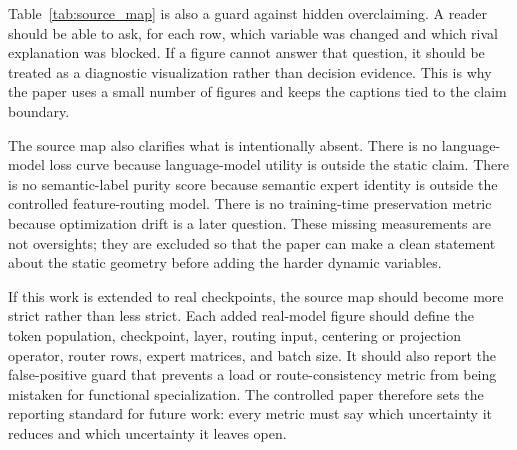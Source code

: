 \begin{table}[t]
\centering
\caption{Source map for the main evidence objects.}
\label{tab:source_map}
\small
\setlength{\tabcolsep}{3pt}
\end{table}

Table~\ref{tab:source_map} is also a guard against hidden overclaiming. A reader
should be able to ask, for each row, which variable was changed and which rival
explanation was blocked. If a figure cannot answer that question, it should be
treated as a diagnostic visualization rather than decision evidence. This is
why the paper uses a small number of figures and keeps the captions tied to the
claim boundary.

The source map also clarifies what is intentionally absent. There is no
language-model loss curve because language-model utility is outside the static
claim. There is no semantic-label purity score because semantic expert identity
is outside the controlled feature-routing model. There is no training-time
preservation metric because optimization drift is a later question. These
missing measurements are not oversights; they are excluded so that the paper can
make a clean statement about the static geometry before adding the harder
dynamic variables.

If this work is extended to real checkpoints, the source map should become more
strict rather than less strict. Each added real-model figure should define the
token population, checkpoint, layer, routing input, centering or projection
operator, router rows, expert matrices, and batch size. It should also report
the false-positive guard that prevents a load or route-consistency metric from
being mistaken for functional specialization. The controlled paper therefore
sets the reporting standard for future work: every metric must say which
uncertainty it reduces and which uncertainty it leaves open.

